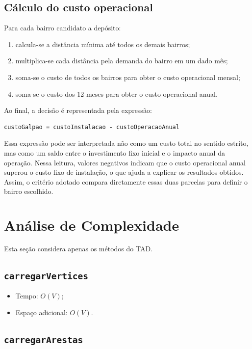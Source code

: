 \documentclass[12pt,a4paper]{article}
\begin{document}
\subsection{Cálculo do custo operacional}

Para cada bairro candidato a depósito:

\begin{enumerate}[noitemsep]
    \item calcula-se a distância mínima até todos os demais bairros;
    \item multiplica-se cada distância pela demanda do bairro em um dado mês;
    \item soma-se o custo de todos os bairros para obter o custo operacional mensal;
    \item soma-se o custo dos 12 meses para obter o custo operacional anual.
\end{enumerate}

Ao final, a decisão é representada pela expressão:

\begin{lstlisting}
custoGalpao = custoInstalacao - custoOperacaoAnual
\end{lstlisting}

Essa expressão pode ser interpretada não como um custo total no sentido
estrito, mas como um saldo entre o investimento fixo inicial e o impacto anual
da operação. Nessa leitura, valores negativos indicam que o custo operacional
anual superou o custo fixo de instalação, o que ajuda a explicar os resultados
obtidos. Assim, o critério adotado compara diretamente essas duas parcelas para
definir o bairro escolhido.

\section{Análise de Complexidade}

Esta seção considera apenas os métodos do TAD.

\subsection{\texttt{carregarVertices}}

\begin{itemize}[noitemsep]
    \item Tempo: $O(V)$;
    \item Espaço adicional: $O(V)$.
\end{itemize}

\subsection{\texttt{carregarArestas}}
\end{document}
